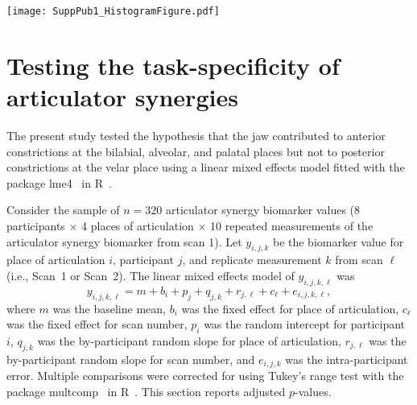\documentclass[reprint]{JASAnew}\usepackage[]{graphicx}\usepackage[]{color}
\begin{document}
\begin{figure*}

\texttt{[image: SuppPub1\_HistogramFigure.pdf]}

\caption{\label{fig:histograms}(color online) 
Sample distribution of the jaw contributions to constrictions at the bilabial, alveolar, palatal, velar, and pharyngeal places of articulation. The quantity plotted is the percent of a constriction that was produced by the jaw.
A value of \SI{0}{\percent} indicates that lip or tongue motion produced the entire constriction, whereas a value of \SI{100}{\percent} indicates that jaw motion produced the entire constriction. 
Sample distribution by participant shown with a different color for each participant.}

\end{figure*}











\section{Testing the task-specificity of articulator synergies}
\label{sec:taskdependence}

The present study tested the hypothesis that the jaw contributed to anterior constrictions at the bilabial, alveolar, and palatal places but not to posterior constrictions at the velar place using a linear mixed effects model fitted with the package lme4~\citep{bates2015fitting} in R~\citep{r2017language}. 


Consider the sample of $n=320$ articulator synergy biomarker values (\num{8} participants $\times$ \num{4} places of articulation $\times$ \num{10} repeated measurements of the articulator synergy biomarker from scan \num{1}). Let $y_{i,j,k}$ be the biomarker value for place of articulation $i$, participant $j$, and replicate measurement $k$ from scan $\ell$ (i.e., Scan~\num{1} or Scan~\num{2}). The linear mixed effects model of $y_{i,j,k,\ell}$ was 
%
\begin{equation}
y_{i,j,k,\ell} = m + b_i + p_j + q_{j,k} + r_{j,\ell} + c_\ell + e_{i,j,k,\ell},
\end{equation}
%
where $m$ was the baseline mean, $b_i$ was the fixed effect for place of articulation, $c_\ell$ was the fixed effect for scan number, $p_i$ was the random intercept for participant $i$, $q_{j,k}$ was the by-participant random slope for place of articulation, $r_{j,\ell}$ was the by-participant random slope for scan number, and $e_{i,j,k}$ was the intra-participant error. Multiple comparisons were corrected for using Tukey's range test with the package multcomp~\citep{hothorn2008simultaneous} in R~\citep{r2017language}. This section reports adjusted $p$-values. 
\end{document}
